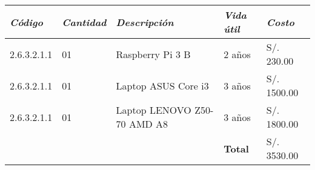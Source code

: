             \begin{table}[h!]
                \centering
                \begin{tabular}{|p{2cm}|p{1.8cm}|p{3.8cm}|p{1.8cm}|p{2cm}|} \hline
                    
                
                \textit{{\bf{Código}}} &
                \textit{{\bf{Cantidad}}} &
                \textit{{\bf{Descripción}}} &
                \textit{{\bf{Vida útil}}}  &
                \textit{{\bf{Costo}}}
                \\ \hline

                2.6.3.2.1.1 &
                01 &
                Raspberry Pi 3 B &
                2 años &
                S/. 230.00
                \\ \hline

                2.6.3.2.1.1 &
                01 &
                Laptop ASUS Core i3 &
                3 años &
                S/. 1500.00
                \\ \hline

                2.6.3.2.1.1&
                01 &
                Laptop LENOVO Z50-70 AMD A8 &
                3 años &
                S/. 1800.00
                \\ \hline

                &
                &
                &
                \bf{Total} &
                S/. 3530.00
                \\ \hline

                \end{tabular}
            \end{table}


